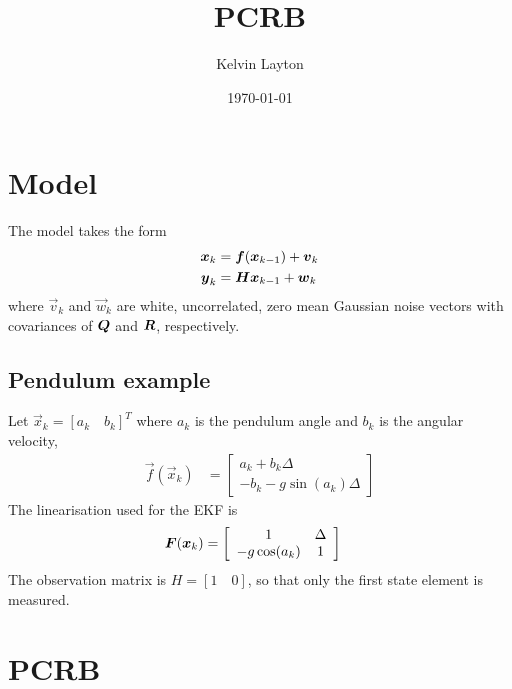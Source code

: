 \documentclass{article}
\title{PCRB}
\author{Kelvin Layton}
\date{\today}
\begin{document}
\section{Model}

The model takes the form
\begin{align}
	{\boldsymbol x}_k &= {\boldsymbol f}({\boldsymbol x}_{k-1}) + {\boldsymbol v}_k \\
	{\boldsymbol y}_k &= \boldsymbol{H}{\boldsymbol x}_{k-1} + {\boldsymbol w}_k
\end{align}
where $\vec v_k$ and $\vec w_k$ are white, uncorrelated, zero mean Gaussian noise vectors with covariances of $\boldsymbol{Q}$ and $\boldsymbol{R}$, respectively.


\subsection{Pendulum example}

Let $\vec x_k = [a_k\quad b_k]^T$ where $a_k$ is the pendulum angle and $b_k$ is the angular velocity,
\begin{align}
	\vec f(\vec x_{k}) &= \left[\begin{array}{c}
								a_k + b_k\Delta \\ -b_k - g\sin(a_k)\Delta
								\end{array}\right]
\end{align}
The linearisation used for the EKF is
\begin{align}
	\boldsymbol{F}({\boldsymbol x}_{k}) &= \left[\begin{array}{cc}
					1 & \Delta \\
					-g\cos(a_k) & 1 \\
				\end{array}\right]
\end{align}
The observation matrix is $H=[1\quad 0]$, so that only the first state element is measured.

\section{PCRB}
\end{document}
